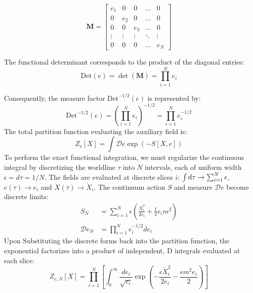 \begin{tcolorbox}[breakable]
	\begin{equation}
		\mathbf{M} = 
		\begin{bmatrix}
			e_1 & 0 & 0 & \dots & 0 \\
			0 & e_2 & 0 & \dots & 0 \\
			0 & 0 & e_3 & \dots & 0 \\
			\vdots & \vdots & \vdots & \ddots & \vdots \\
			0 & 0 & 0 & \dots & e_N
		\end{bmatrix}
	\end{equation}
	
	The functional determinant corresponds to the product of the diagonal entries:
	\begin{equation}
		\text{Det}(e) = \det(\mathbf{M}) = \prod_{i=1}^N e_i
	\end{equation}
	
	Consequently, the measure factor $\text{Det}^{-1/2}(e)$ is represented by:
	\begin{equation}
		\text{Det}^{-1/2}(e) = \left( \prod_{i=1}^N e_i \right)^{-1/2} = \prod_{i=1}^N e_i^{-1/2}
	\end{equation}
	The total partition function evaluating the auxiliary field is:
	\begin{equation}
		Z_e[X] = \int \mathcal{D}e \exp\left( -S[X, e] \right)
	\end{equation}
	To perform the exact functional integration, we must regularize the continuous integral by discretizing the worldline $\tau$ into $N$ intervals, each of uniform width $\epsilon = d\tau = 1/N$. The fields are evaluated at discrete slices $i$: $\int\mathrm{d}\tau\to\sum_{i=1}^{N}\epsilon$, $e(\tau) \to e_i$ and $\dot{X}(\tau) \to \dot{X}_i$. The continuum action $S$ and measure $\mathcal{D}e$ become discrete limits:
	\begin{align}
		S_N &= \sum_{i=1}^N \epsilon \left( \frac{\dot{X}_i^2}{2e_i} + \frac{1}{2} e_i m^2 \right) \\
		\mathcal{D}e_N &= \prod_{i=1}^N e_i^{-1/2} de_i
	\end{align}
	Upon Substituting the discrete forms back into the partition function, the exponential factorizes into a product of independent, D integrals evaluated at each slice:
	\begin{equation}
		Z_{e, N}[X] = \prod_{i=1}^N \left[ \int_{0}^{\infty} \frac{de_i}{\sqrt{e_i}} \exp\left( - \frac{\epsilon \dot{X}_i^2}{2e_i} - \frac{\epsilon m^2 e_i}{2} \right) \right]
	\end{equation}


\end{tcolorbox}
